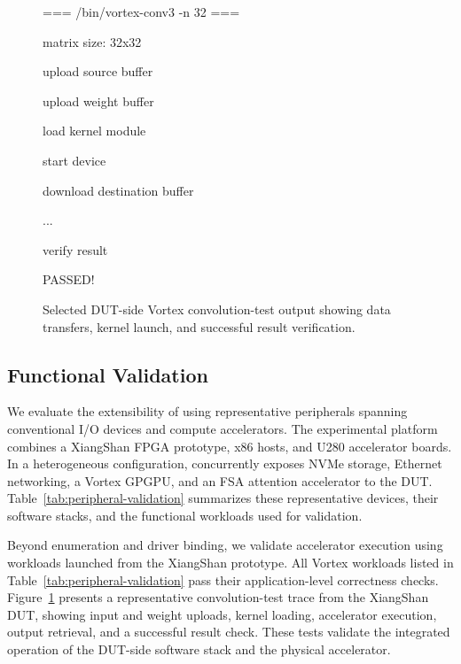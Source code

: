 \begin{figure}[!b]
\centering
\begin{minipage}{\columnwidth}
\small\ttfamily\raggedright
\setlength{\parindent}{0pt}
\setlength{\parskip}{0pt}
=== /bin/vortex-conv3 -n 32 ===\par
matrix size: 32x32\par
upload source buffer\par
upload weight buffer\par
load kernel module\par
start device\par
download destination buffer\par
...\par
verify result\par
PASSED!\par
\end{minipage}
\captionsetup{skip=4pt}
\caption{Selected DUT-side Vortex convolution-test output showing data
transfers, kernel launch, and successful result verification.}
\label{fig:vortex-functional-trace}
\end{figure}

\subsection{Functional Validation}
\label{sec:functional-validation}

We evaluate the extensibility of \sys using representative peripherals spanning
conventional I/O devices and compute accelerators. The experimental platform
combines a XiangShan FPGA prototype, x86 hosts, and U280 accelerator boards.
In a heterogeneous configuration, \sys concurrently exposes NVMe storage,
Ethernet networking, a Vortex GPGPU, and an FSA attention accelerator to the
DUT. Table~\ref{tab:peripheral-validation} summarizes these representative
devices, their software stacks, and the functional workloads used for validation.



Beyond enumeration and driver binding, we validate accelerator execution
using workloads launched from the XiangShan prototype. All Vortex workloads
listed in Table~\ref{tab:peripheral-validation} pass their application-level
correctness checks. Figure~\ref{fig:vortex-functional-trace} presents a
representative convolution-test trace from the XiangShan DUT, showing input
and weight uploads, kernel loading, accelerator execution, output retrieval,
and a successful result check. These tests validate the integrated operation
of the DUT-side software stack and the physical accelerator.



